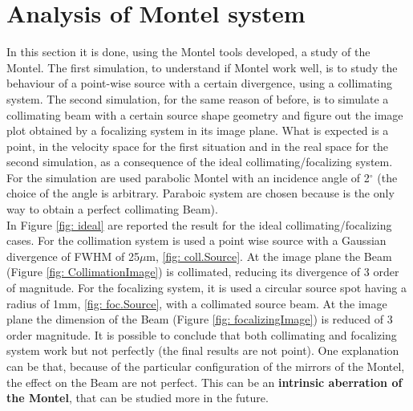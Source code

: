 \section{Analysis of Montel system}
In this section it is done, using the Montel tools developed, a study of the Montel. The first simulation, to understand if  Montel work well, is to study the behaviour of a point-wise source with a certain divergence, using a collimating system. The second simulation, for the same reason of before, is to simulate a collimating beam with a certain source shape geometry and figure out the image plot obtained by a focalizing system in its image plane. What is expected is a point, in the velocity space for the first situation and in the real space for the second simulation, as a consequence of the ideal collimating/focalizing system. For the simulation are used parabolic Montel with an incidence angle of 2$^{\circ} $ (the choice of the angle is arbitrary. Paraboic system are chosen because is the only way to obtain a perfect collimating Beam).
\\
In Figure \ref{fig: ideal} are reported the result for the ideal collimating/focalizing cases.
For the collimation system is used a point wise source with a Gaussian divergence of FWHM of 25$\mu $m, \ref{fig: coll.Source}. At the image plane the Beam (Figure \ref{fig: CollimationImage}) is collimated, reducing its divergence of 3 order of magnitude. For the focalizing system, it is used a circular source spot having a radius of 1mm, \ref{fig: foc.Source}, with a collimated source beam. At the image plane the dimension of the Beam (Figure \ref{fig: focalizingImage}) is reduced of 3 order magnitude. It is possible to conclude that both collimating and focalizing system work but not perfectly (the final results are not point). One explanation can be that, because of the particular configuration of the mirrors of the Montel, the effect on the Beam are not perfect. This can be an \textbf{intrinsic aberration of the Montel}, that can be studied more in the future.
\\
